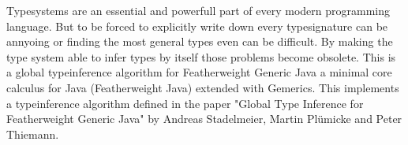 Typesystems are an essential and powerfull part of every modern programming language.
But to be forced to explicitly write down every typesignature can be annyoing or
finding the most general types even can be difficult.
By making the type system able to infer types by itself those problems become obsolete.
This is a global typeinference algorithm for Featherweight Generic Java a minimal core calculus for Java (Featherweight Java) extended with Gemerics.
This implements a typeinference algorithm defined in the paper "Global Type Inference for Featherweight Generic
Java" by Andreas Stadelmeier, Martin Plümicke and Peter Thiemann.

